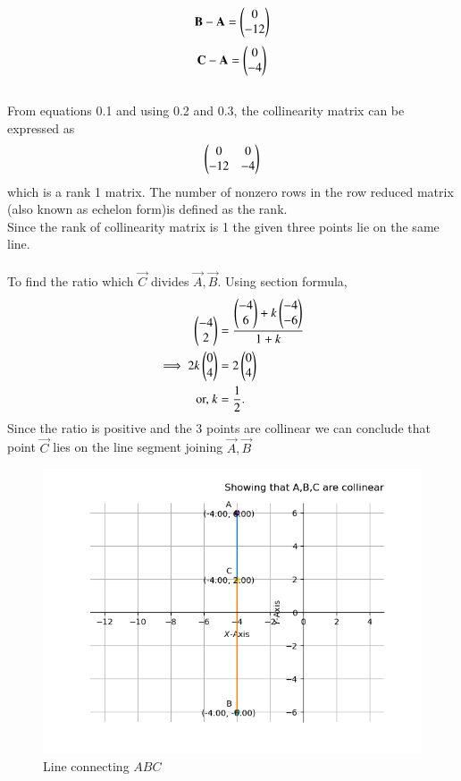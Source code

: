 \documentclass[journal]{IEEEtran}
\begin{document}
  \begin{align}
 \mathbf{B}-\mathbf{A}=\begin{pmatrix} 0\\ -12\end{pmatrix}
\end{align}
\begin{align}
 \mathbf{C}-\mathbf{A}=\begin{pmatrix} 0\\ -4\end{pmatrix}
\end{align}\\
From equations 0.1 and using 0.2 and 0.3, the collinearity matrix can be expressed as
 \begin{align}
			    \begin{pmatrix}0 & 0\\-12 & -4 \end{pmatrix}  
\end{align}
which is a rank 1 matrix. The number of nonzero rows in the row reduced matrix (also known as  echelon form)is defined as the rank.\\
Since the rank of collinearity matrix is 1 the given three points lie on the same line.\\\\
To find the ratio which $\vec{C}$ divides $\vec{A},\vec{B}$. Using section formula,
\begin{align}
         \begin{pmatrix}-4\\2\end{pmatrix} &=\frac{{\begin{pmatrix}-4\\6\end{pmatrix}+k\begin{pmatrix}-4\\-6\end{pmatrix}}}{1+k}\\
	 \implies 2k\begin{pmatrix}0 \\ 4\end{pmatrix} &= 2\begin{pmatrix}0 \\ 4\end{pmatrix}
	 \\
	 \text{or, } k &= \frac{1}{2}.
\end{align}
Since the ratio is positive and the 3 points are collinear we can conclude that point $\vec{C}$ lies on the line segment joining $\vec{A},\vec{B}$\\
\begin{figure}[h!]
   \centering
   \includegraphics[width=0.7\linewidth]{figs/Figure_1.png}
   \caption{Line connecting $ABC$}
   \label{stemplot}
\end{figure}
	
\end{document}
